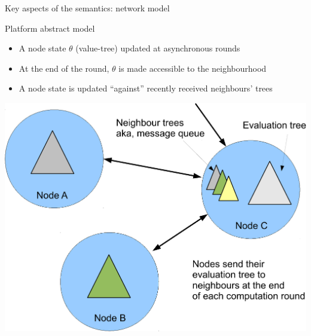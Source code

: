 \documentclass[presentation, 9pt]{beamer}\mode<presentation>{\usetheme{AMSBolognaFC}}
\begin{document}
\begin{frame}{Key aspects of the semantics: network model}
	\begin{exampleblock}{Platform abstract model}
	\begin{itemize}
			\item A node state $\theta$ (value-tree) updated at asynchronous rounds
			\item At the end of the round, $\theta$ is made accessible to the neighbourhood
			\item A node state is updated ``against'' recently received neighbours' trees
	\end{itemize}
	\end{exampleblock}
	\centering
	\includegraphics[height=0.5\textheight]{img/nodes.pdf}
	\end{frame}
	
\end{document}
